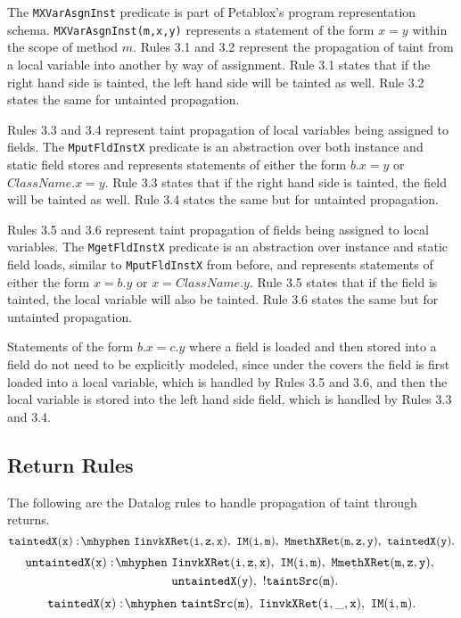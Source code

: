 The \texttt{MXVarAsgnInst} predicate is part of Petablox's program
representation schema. \texttt{MXVarAsgnInst(m,x,y)} represents a
statement of the form $x = y$ within the scope of method $m$. Rules
3.1 and 3.2 represent the propagation of taint from a local variable
into another by way of assignment. Rule 3.1 states that if the right
hand side is tainted, the left hand side will be tainted as well. Rule
3.2 states the same for untainted propagation.

Rules 3.3 and 3.4 represent taint propagation of local variables being
assigned to fields. The \texttt{MputFldInstX} predicate is an
abstraction over both instance and static field stores and represents
statements of either the form $b.x = y$ or $ClassName.x = y$. Rule 3.3
states that if the right hand side is tainted, the field will be
tainted as well. Rule 3.4 states the same but for untainted
propagation.

Rules 3.5 and 3.6 represent taint propagation of fields being assigned
to local variables. The \texttt{MgetFldInstX} predicate is an
abstraction over instance and static field loads, similar to
\texttt{MputFldInstX} from before, and represents statements of either
the form $x = b.y$ or $x = ClassName.y$. Rule 3.5 states that if the
field is tainted, the local variable will also be tainted. Rule 3.6
states the same but for untainted propagation.

Statements of the form $b.x = c.y$ where a field is loaded and then
stored into a field do not need to be explicitly modeled, since under
the covers the field is first loaded into a local variable, which is
handled by Rules 3.5 and 3.6, and then the local variable is stored
into the left hand side field, which is handled by Rules 3.3 and 3.4.
\subsection{Return Rules}
The following are the Datalog rules to handle propagation of taint
through returns.
\begin{equation}
  \mathtt{taintedX(x) \is IinvkXRet(i,z,x) \also IM(i,m) \also
    MmethXRet(m,z,y) \also taintedX(y).}
\end{equation}
\begin{equation}
  \begin{split}
    \mathtt{untaintedX(x) \is} & \mathtt{IinvkXRet(i,z,x) \also
      IM(i,m) \also MmethXRet(m,z,y) \also} \\ & \mathtt{
      untaintedX(y) \also !taintSrc(m).} \\
  \end{split}
\end{equation}
\begin{equation}
  \mathtt{taintedX(x) \is taintSrc(m) \also IinvkXRet(i,\_,x) \also
    IM(i,m).}
\end{equation}

